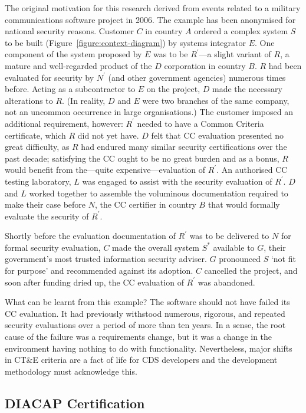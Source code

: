 \documentclass[10pt,letterpaper,conference,compsocconf]{IEEEtran}
\begin{document}
The original motivation for this research derived from events related
to a military communications software project in 2006.  The example
has been anonymised for national security reasons.  Customer $C$ in
country $A$ ordered
a complex system $S$ to be built (Figure~\ref{figure:context-diagram})
by systems integrator $E$.
One component of the system proposed by $E$ was to be $R^\prime$---a
slight variant of $R$, a mature and well-regarded
product of the $D$ corporation in country $B$.  $R$ had been
evaluated for security by $N^\prime$ (and other government agencies)
numerous times before.
Acting as a subcontractor to $E$ on the project, $D$ made the necessary
alterations to $R$.  (In reality, $D$ and $E$ were two branches of
the same company, not an uncommon occurrence in large organisations.)
The customer imposed an additional requirement, however:
$R^\prime$ needed to have a Common Criteria certificate, which
$R$ did not yet have.
$D$ felt that CC evaluation presented no great difficulty, as $R$
had endured many similar security certifications over the past decade;
satisfying the CC ought to be no great burden and as a bonus, $R$
would benefit from the---quite expensive---evaluation of $R^\prime$.
An authorised CC testing
laboratory, $L$ was engaged to assist with the security evaluation
of $R^\prime$.
$D$ and $L$ worked together to assemble the voluminous
documentation required to make their case before $N$, the CC certifier
in country $B$ that would formally evaluate the security of $R^\prime$.

Shortly before the evaluation documentation of $R^\prime$ was to be
delivered to $N$ for formal security
evaluation, $C$ made the overall system $S^\ast$ available to $G$, their
government's most trusted information security adviser.  $G$ pronounced
$S$ `not fit for purpose' and recommended against its adoption.
$C$ cancelled the
project, and soon after funding dried up, the CC evaluation of
$R^\prime$ was abandoned.

What can be learnt from this example?  The
software should not have failed its CC evaluation.  It had previously
withstood
numerous, rigorous, and repeated security evaluations over a period
of more than ten years.  In a sense, the root cause of the failure
was a requirements change,
but it was a change in the environment having nothing to do with
functionality.  Nevertheless, major shifts in CT\&E criteria are a
fact of life for CDS developers and the development methodology must
acknowledge this.

\subsection{DIACAP Certification}
\end{document}
